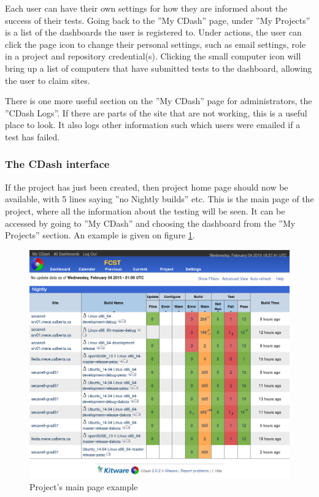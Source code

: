 Each user can have their own settings for how they are informed about the success of their tests. Going back to the ''My CDash'' page, under ''My Projects'' is a list of the dashboards the user is registered to. Under actions, the user can click the page icon to change their personal settings, such as email settings, role in a project and repository credential(s). Clicking the small computer icon will bring up a list of computers that have submitted tests to the dashboard, allowing the user to claim sites. 

There is one more useful section on the ''My CDash'' page for administrators, the ''CDash Logs''. If there are parts of the site that are not working, this is a useful place to look. It also logs other information such which users were emailed if a test has failed. 

\subsubsection{The CDash interface}

If the project has just been created, then project home page should now be available, with 5 lines saying ''no Nightly builds'' etc. This is the main page of the project, where all the information about the testing will be seen. It can be accessed by going to ''My CDash'' and choosing the dashboard from the ''My Projects'' section. An example is given on figure \ref{fig:project_page}.

\begin{figure}[!h]
\centering
\includegraphics[width=1\textwidth]{figures/CDash/cdash.png}
\caption{Project's main page example}
\label{fig:project_page}
\end{figure}

